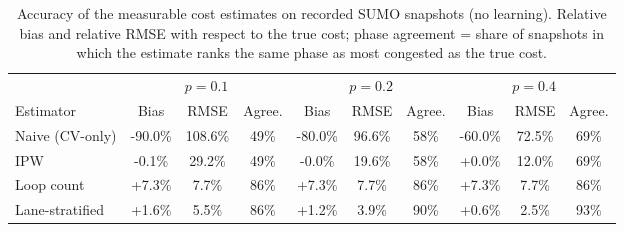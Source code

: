\begin{table}[t]
\centering
\caption{Accuracy of the measurable cost estimates on recorded SUMO snapshots (no learning). Relative bias and relative RMSE with respect to the true cost; phase agreement = share of snapshots in which the estimate ranks the same phase as most congested as the true cost.}
\label{tab:estimators_acc}
\scriptsize
\setlength{\tabcolsep}{3pt}
\begin{tabular}{@{}lccccccccc@{}}
\toprule
 & \multicolumn{3}{c}{$p=0.1$} & \multicolumn{3}{c}{$p=0.2$} & \multicolumn{3}{c}{$p=0.4$}\\
\cmidrule(lr){2-4}\cmidrule(lr){5-7}\cmidrule(lr){8-10}
Estimator & Bias & RMSE & Agree. & Bias & RMSE & Agree. & Bias & RMSE & Agree.\\
\midrule
Naive (CV-only) & -90.0\% & 108.6\% & 49\% & -80.0\% & 96.6\% & 58\% & -60.0\% & 72.5\% & 69\%\\
IPW & -0.1\% & 29.2\% & 49\% & -0.0\% & 19.6\% & 58\% & +0.0\% & 12.0\% & 69\%\\
Loop count & +7.3\% & 7.7\% & 86\% & +7.3\% & 7.7\% & 86\% & +7.3\% & 7.7\% & 86\%\\
Lane-stratified & +1.6\% & 5.5\% & 86\% & +1.2\% & 3.9\% & 90\% & +0.6\% & 2.5\% & 93\%\\
\bottomrule
\end{tabular}
\end{table}
